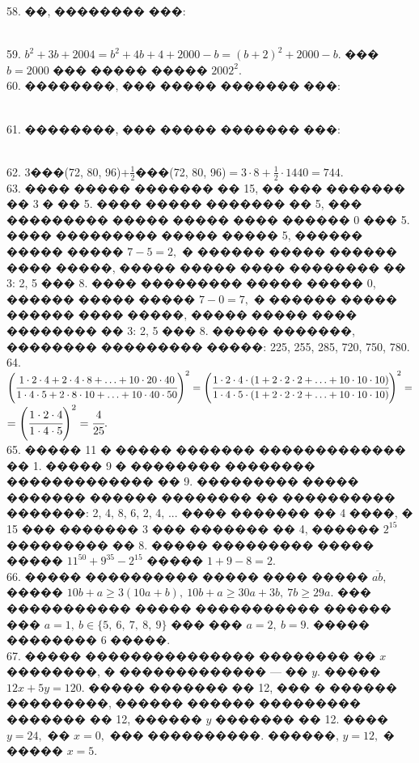 \documentclass[12pt]{article}
\begin{document}
58. ��, �������� ���:
\begin{figure}[ht!]
\end{figure}\\
59. $b^2+3b+2004=b^2+4b+4+2000-b=(b+2)^2+2000-b.$ ��� $b=2000$ ��� ����� ����� $2002^2.$\\
60. ��������, ��� ����� ������� ���:
\begin{figure}[ht!]
\end{figure}\\
61. ��������, ��� ����� ������� ���:
\begin{figure}[ht!]
\end{figure}\\
62. 3���(72, 80, 96)+$\frac{1}{2}$���(72, 80, 96)$=3\cdot8+\frac{1}{2}\cdot1440=744.$\\
63. ���� ����� ������� �� 15, �� ��� ������� �� 3 � �� 5. ���� ����� ������� �� 5, ��� ��������� ����� ����� ���� ������ 0 ��� 5. ���� ��������� ����� ����� 5, ������ ����� ����� $7-5=2,$ � ������ ����� ������ ���� �����, ����� ����� ���� �������� �� 3: 2, 5 ��� 8. ���� ��������� ����� ����� 0, ������ ����� ����� $7-0=7,$ � ������ ����� ������ ���� �����, ����� ����� ���� �������� �� 3: 2, 5 ��� 8. ����� �������, �������� ��������� �����: 225, 255, 285, 720, 750, 780.\\
64. $\left( \cfrac{1\cdot2\cdot4+2\cdot4\cdot8+\ldots+10\cdot20\cdot40}{1\cdot4\cdot5+2\cdot8\cdot10+\ldots+10\cdot40\cdot50}\right)^2=
\left( \cfrac{1\cdot2\cdot4\cdot(1+2\cdot2\cdot2+\ldots+10\cdot10\cdot10)}{1\cdot4\cdot5\cdot(1+2\cdot2\cdot2+\ldots+10\cdot10\cdot10)}\right)^2=$\\$=
\left( \cfrac{1\cdot2\cdot4}{1\cdot4\cdot5}\right)^2=\cfrac{4}{25}.$\\
65. ����� 11 � ����� ������� ������������� �� 1. ����� 9 � �������� �������� ������������� �� 9. ��������� ����� ������� ������ �������� �� ���������� �������: 2, 4, 8, 6, 2, 4, ... ���� ������� �� 4 ����, � 15 ��� ������� 3 ��� ������� �� 4, ������ $2^{15}$ ��������� �� 8. ����� ��������� ����� ����� $11^{50}+9^{35}-2^{15}$
����� $1+9-8=2.$\\
66. ����� ���������� ����� ���� �����  $\overline{ab},$ ����� $10b+a\geqslant3(10a+b),\ 10b+a\geqslant30a+3b,\ 7b\geqslant29a.$ ��� ����������� ����� ����������� ������ ��� $a=1,\ b\in\{5,\ 6,\ 7,\ 8,\ 9\}$ ��� ��� $a=2,\ b=9.$ ����� �������� 6 �����.\\
67. ����� ��������������� �������� �� $x$ ��������, � ������������� --- �� $y.$ ����� $12x+5y=120.$ ����� ������� �� 12, ��� � ������ ���������, ������ ������ ��������� ������� �� 12, ������ $y$ ������� �� 12. ���� $y=24,$ �� $x=0,$ ��� ����������. ������, $y=12,$ � ����� $x=5.$\\
\end{document}
